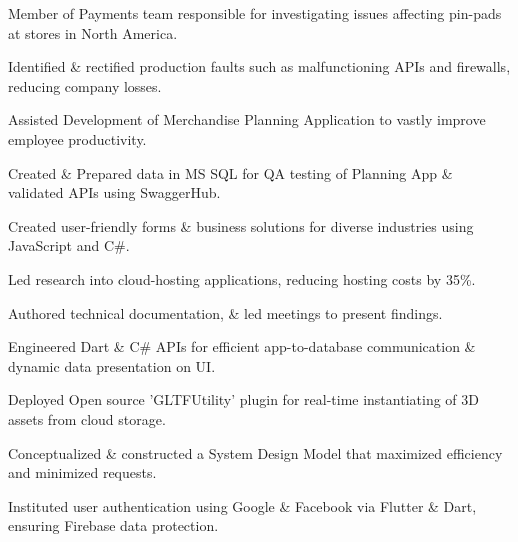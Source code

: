 \documentclass[]{deedy-resume-openfont}
\begin{document}
\begin{tightemize}
\item Member of Payments team responsible for investigating issues affecting pin-pads at stores in North America.
\item Identified \& rectified production faults such as malfunctioning APIs and firewalls, reducing company losses.
\item Assisted Development of Merchandise Planning Application to vastly improve employee productivity. 
\item Created \& Prepared data in MS SQL for QA testing of Planning App \& validated APIs using SwaggerHub.
\end{tightemize}
\sectionsep

\begin{tightemize}
\item Created user-friendly forms \& business solutions for diverse industries using JavaScript and C\#.
\item Led research into cloud-hosting applications, reducing hosting costs by 35\%.
\item Authored technical documentation, \& led meetings to present findings.
\end{tightemize}




\begin{tightemize}
\item Engineered Dart \& C\# APIs for efficient app-to-database communication \& dynamic data presentation on UI.
\item Deployed Open source 'GLTFUtility' plugin for real-time instantiating of 3D assets from cloud storage.
\item Conceptualized \& constructed a System Design Model that maximized efficiency and minimized requests.
\item Instituted user authentication using Google \& Facebook via Flutter \& Dart, ensuring Firebase data protection.
\end{tightemize}
\sectionsep
\end{document}
